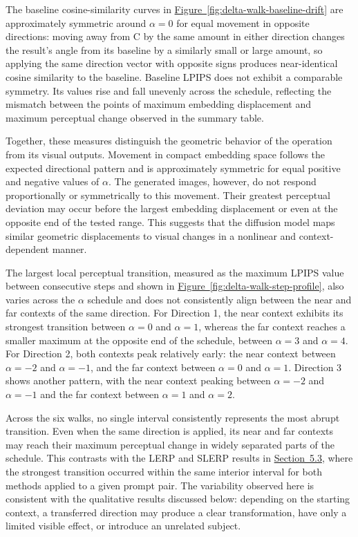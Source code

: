 The baseline cosine-similarity curves in \hyperref[fig:delta-walk-baseline-drift]{Figure~\ref*{fig:delta-walk-baseline-drift}} are approximately symmetric around $\alpha=0$ for equal movement in opposite directions: moving away from C by the same amount in either direction changes the result's angle from its baseline by a similarly small or large amount, so applying the same direction vector with opposite signs produces near-identical cosine similarity to the baseline. Baseline LPIPS does not exhibit a comparable symmetry. Its values rise and fall unevenly across the schedule, reflecting the mismatch between the points of maximum embedding displacement and maximum perceptual change observed in the summary table.

Together, these measures distinguish the geometric behavior of the operation from its visual outputs. Movement in compact embedding space follows the expected directional pattern and is approximately symmetric for equal positive and negative values of $\alpha$. The generated images, however, do not respond proportionally or symmetrically to this movement. Their greatest perceptual deviation may occur before the largest embedding displacement or even at the opposite end of the tested range. This suggests that the diffusion model maps similar geometric displacements to visual changes in a nonlinear and context-dependent manner.

The largest local perceptual transition, measured as the maximum LPIPS value between consecutive steps and shown in \hyperref[fig:delta-walk-step-profile]{Figure~\ref*{fig:delta-walk-step-profile}}, also varies across the $\alpha$ schedule and does not consistently align between the near and far contexts of the same direction. For Direction 1, the near context exhibits its strongest transition between $\alpha=0$ and $\alpha=1$, whereas the far context reaches a smaller maximum at the opposite end of the schedule, between $\alpha=3$ and $\alpha=4$. For Direction 2, both contexts peak relatively early: the near context between $\alpha=-2$ and $\alpha=-1$, and the far context between $\alpha=0$ and $\alpha=1$. Direction 3 shows another pattern, with the near context peaking between $\alpha=-2$ and $\alpha=-1$ and the far context between $\alpha=1$ and $\alpha=2$.

Across the six walks, no single interval consistently represents the most abrupt transition. Even when the same direction is applied, its near and far contexts may reach their maximum perceptual change in widely separated parts of the schedule. This contrasts with the LERP and SLERP results in \hyperref[sec:5.3]{Section~5.3}, where the strongest transition occurred within the same interior interval for both methods applied to a given prompt pair. The variability observed here is consistent with the qualitative results discussed below: depending on the starting context, a transferred direction may produce a clear transformation, have only a limited visible effect, or introduce an unrelated subject.

